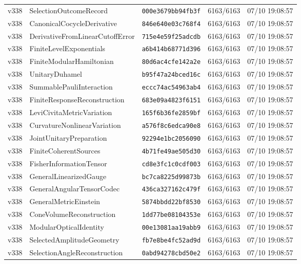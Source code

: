 \documentclass[11pt]{article}
\theoremstyle{definition}\newtheorem{deriv}{Derivação}
\begin{document}
{\begin{longtable}{@{}lllll@{}}
v338 & SelectionOutcomeRecord & \texttt{000e3679bb94fb3f} & 6163/6163 & 07/10 19:08:57 \\
v338 & CanonicalCocycleDerivative & \texttt{846e640e03c768f4} & 6163/6163 & 07/10 19:08:57 \\
v338 & DerivativeFromLinearCutoffError & \texttt{715e4e59f25adcdb} & 6163/6163 & 07/10 19:08:57 \\
v338 & FiniteLevelExponentials & \texttt{a6b414b68771d396} & 6163/6163 & 07/10 19:08:57 \\
v338 & FiniteModularHamiltonian & \texttt{80d6ac4cfe142a2e} & 6163/6163 & 07/10 19:08:57 \\
v338 & UnitaryDuhamel & \texttt{b95f47a24bced16c} & 6163/6163 & 07/10 19:08:57 \\
v338 & SummablePauliInteraction & \texttt{eccc74ac54963ab4} & 6163/6163 & 07/10 19:08:57 \\
v338 & FiniteResponseReconstruction & \texttt{683e09a4823f6151} & 6163/6163 & 07/10 19:08:57 \\
v338 & LeviCivitaMetricVariation & \texttt{165f6b36fe2859bf} & 6163/6163 & 07/10 19:08:57 \\
v338 & CurvatureNonlinearVariation & \texttt{a576f8c6edca90e8} & 6163/6163 & 07/10 19:08:57 \\
v338 & JointUnitaryPreparation & \texttt{92294e1bc2056090} & 6163/6163 & 07/10 19:08:57 \\
v338 & FiniteCoherentSources & \texttt{4b71fe49ae505d30} & 6163/6163 & 07/10 19:08:57 \\
v338 & FisherInformationTensor & \texttt{cd8e3fc1c0cdf003} & 6163/6163 & 07/10 19:08:57 \\
v338 & GeneralLinearizedGauge & \texttt{bc7ca8225d99873b} & 6163/6163 & 07/10 19:08:57 \\
v338 & GeneralAngularTensorCodec & \texttt{436ca327162c479f} & 6163/6163 & 07/10 19:08:57 \\
v338 & GeneralMetricEinstein & \texttt{5874bbdd22bf8530} & 6163/6163 & 07/10 19:08:57 \\
v338 & ConeVolumeReconstruction & \texttt{1dd77be08104353e} & 6163/6163 & 07/10 19:08:57 \\
v338 & ModularOpticalIdentity & \texttt{00e13081aa19abb9} & 6163/6163 & 07/10 19:08:57 \\
v338 & SelectedAmplitudeGeometry & \texttt{fb7e8be4fc52ad9d} & 6163/6163 & 07/10 19:08:57 \\
v338 & SelectionAngleReconstruction & \texttt{0abd94278cbd50e2} & 6163/6163 & 07/10 19:08:57 \\

\end{longtable}}
\end{document}
